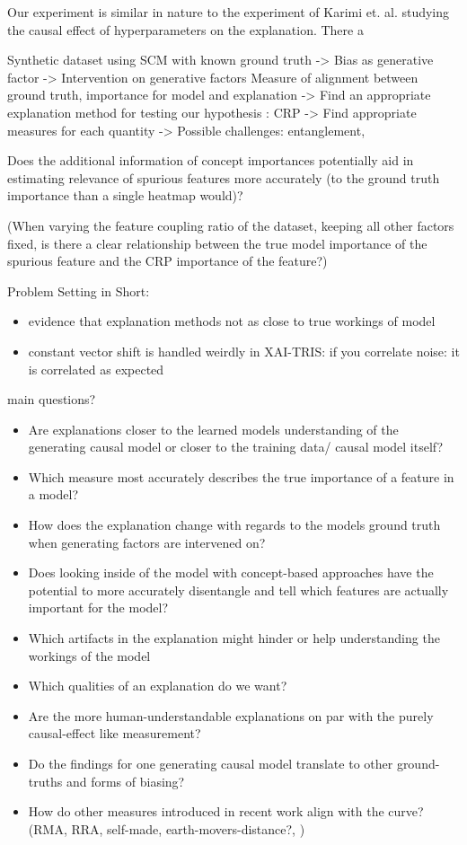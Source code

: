 Our experiment is similar in nature to the experiment of Karimi et. al. \cite{Karimi2023} studying the causal effect of hyperparameters on the explanation.
There a

Synthetic dataset using SCM with known ground truth
-> Bias as generative factor
-> Intervention on generative factors
Measure of alignment between ground truth, importance for model and explanation
-> Find an appropriate explanation method for testing our hypothesis : CRP
-> Find appropriate measures for each quantity
-> Possible challenges: entanglement,


Does the additional information of concept importances potentially aid in estimating
relevance of spurious features  more accurately (to the ground truth importance than a single heatmap would)?


(When varying the feature coupling ratio of the dataset, keeping all other factors fixed, is there a clear relationship between the true model importance of the spurious feature and the CRP importance of the feature?)



Problem Setting in Short:

\begin{itemize}
    \item evidence that explanation methods not as close to true workings of model
    \item constant vector shift is handled weirdly in XAI-TRIS: if you correlate noise: it is correlated as expected
\end{itemize}


main questions?
\begin{itemize}
    \item Are explanations closer to the learned models understanding of the generating causal model or closer to the training data/ causal model itself?
    \item Which measure most accurately describes the true importance of a feature in a model?
    \item How does the explanation change with regards to the models ground truth when generating factors are intervened on?
    \item Does looking inside of the model with concept-based approaches have the potential to more accurately disentangle and tell which features are actually important for the model?
    \item Which artifacts in the explanation might hinder or help understanding the workings of the model
    \item Which qualities of an explanation do we want?
    \item Are the more human-understandable explanations on par with the purely causal-effect like measurement?
    \item Do the findings for one generating causal model translate to other ground-truths and forms of biasing?
    \item How do other measures introduced in recent work align with the curve? (RMA, RRA, self-made, earth-movers-distance?, )
\end{itemize}

